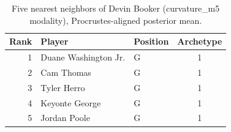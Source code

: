 \begin{table}[htbp]
  \centering\small
  \begin{tabular}{rllc}
    \toprule
    Rank & Player & Position & Archetype \\
    \midrule
    1 & Duane Washington Jr. & G & 1 \\
    2 & Cam Thomas & G & 1 \\
    3 & Tyler Herro & G & 1 \\
    4 & Keyonte George & G & 1 \\
    5 & Jordan Poole & G & 1 \\
    \bottomrule
  \end{tabular}
  \caption{Five nearest neighbors of Devin Booker (curvature_m5 modality), Procrustes-aligned posterior mean.}
  \label{tab:Devin_Booker_neighbors_curvature_m5}
\end{table}

